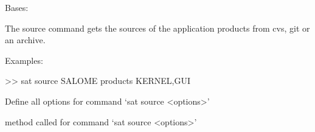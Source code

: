 \documentclass[a4paper,10pt,english]{sphinxmanual}
\begin{document}
\begin{fulllineitems}
\label{\detokenize{apidoc_commands/commands:commands.source.Command}}
Bases: 

The source command gets the sources of the application products
from cvs, git or an archive.

\begin{DUlineblock}{0em}
\item[] Examples:
\item[] \textgreater{}\textgreater{} sat source SALOME \textendash{}products KERNEL,GUI
\end{DUlineblock}

\begin{fulllineitems}
\label{\detokenize{apidoc_commands/commands:commands.source.Command.getParser}}
Define all options for command ‘sat source \textless{}options\textgreater{}’

\end{fulllineitems}


\begin{fulllineitems}
\label{\detokenize{apidoc_commands/commands:commands.source.Command.name}}
\end{fulllineitems}


\begin{fulllineitems}
\label{\detokenize{apidoc_commands/commands:commands.source.Command.run}}
method called for command ‘sat source \textless{}options\textgreater{}’

\end{fulllineitems}


\end{fulllineitems}

\end{document}

